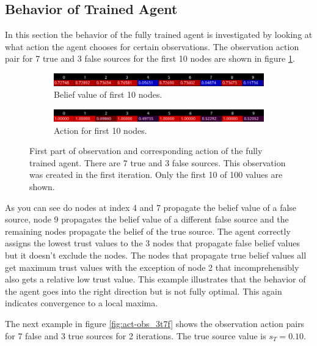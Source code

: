 \documentclass[11pt, a4paper]{article}
\begin{document}
\subsection{Behavior of Trained Agent} \label{sec:res_behavior}
In this section the behavior of the fully trained agent is investigated by looking at what action the agent chooses for certain observations. The observation action pair for 7 true and 3 false sources for the first 10 nodes are shown in figure \ref{fig:act-obs_7t3f}.

\begin{figure}[h]
	\begin{subfigure}{\textwidth}
		\centering
		\includegraphics[width=.85\linewidth]{7t3f_obs_iter1_hc.png}  
		\caption{Belief value of first 10 nodes.}
	\end{subfigure}
	\begin{subfigure}{\textwidth}
		\centering
		\includegraphics[width=.85\linewidth]{7t3f_action_iter1_hc.png}  
		\caption{Action for first 10 nodes.}
	\end{subfigure}
	\caption{\label{fig:act-obs_7t3f}First part of observation and corresponding action of the fully trained agent. There are 7 true and 3 false sources. This observation was created in the first iteration. Only the first 10 of 100 values are shown.}
\end{figure}

As you can see do nodes at index 4 and 7 propagate the belief value of a false source, node 9 propagates the belief value of a different false source and the remaining nodes propagate the belief of the true source. The agent correctly assigns the lowest trust values to the 3 nodes that propagate false belief values but it doesn't exclude the nodes. The nodes that propagate true belief values all get maximum trust values with the exception of node 2 that incomprehensibly also gets a relative low trust value. This example illustrates that the behavior of the agent goes into the right direction but is not fully optimal. This again indicates convergence to a local maxima. \newline

The next example in figure \ref{fig:act-obs_3t7f} shows the observation action pairs for 7 false and 3 true sources for 2 iterations. The true source value is $s_T = 0.10$.
\end{document}
